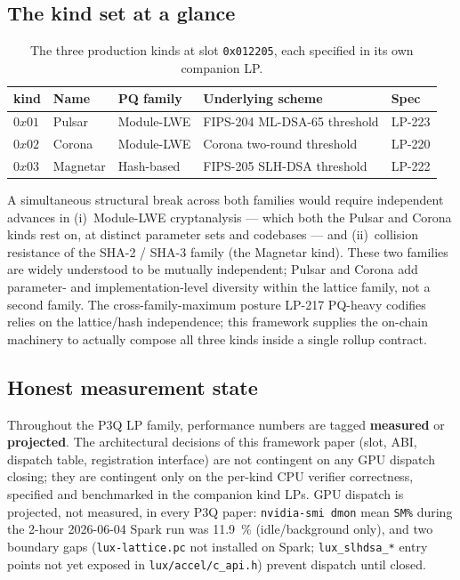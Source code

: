 \subsection{The kind set at a glance}

\begin{table}[h]
\centering
\small
\begin{tabular}{@{}lllll@{}}
\toprule
\textbf{kind} & \textbf{Name} & \textbf{PQ family} & \textbf{Underlying scheme} & \textbf{Spec} \\
\midrule
$0x01$ & Pulsar   & Module-LWE   & FIPS-204 ML-DSA-65 threshold & LP-223 \\
$0x02$ & Corona   & Module-LWE     & Corona two-round threshold & LP-220 \\
$0x03$ & Magnetar & Hash-based   & FIPS-205 SLH-DSA threshold   & LP-222 \\
\bottomrule
\end{tabular}
\caption{The three production kinds at slot \texttt{0x012205},
each specified in its own companion LP.}
\label{tab:kinds-overview}
\end{table}

A simultaneous structural break across both families would
require independent advances in (i)~Module-LWE cryptanalysis ---
which both the Pulsar and Corona kinds rest on, at distinct
parameter sets and codebases --- and (ii)~collision resistance
of the SHA-2 / SHA-3 family (the Magnetar kind). These two
families are widely understood to be mutually independent;
Pulsar and Corona add parameter- and implementation-level
diversity within the lattice family, not a second family. The
cross-family-maximum posture LP-217 PQ-heavy codifies relies on
the lattice/hash independence; this framework supplies the
on-chain machinery to actually compose all three kinds inside a
single rollup contract.

\subsection{Honest measurement state}

Throughout the P3Q LP family, performance numbers are tagged
\textbf{measured} or \textbf{projected}. The architectural
decisions of this framework paper (slot, ABI, dispatch table,
registration interface) are not contingent on any GPU dispatch
closing; they are contingent only on the per-kind CPU verifier
correctness, specified and benchmarked in the companion kind LPs.
GPU dispatch is projected, not measured, in every P3Q paper:
\texttt{nvidia-smi dmon} mean \texttt{SM\%} during the 2-hour
2026-06-04 Spark run was \SI{11.9}{\percent} (idle/background
only), and two boundary gaps (\texttt{lux-lattice.pc} not
installed on Spark; \texttt{lux\_slhdsa\_*} entry points not yet
exposed in \texttt{lux/accel/c\_api.h}) prevent dispatch until
closed.

